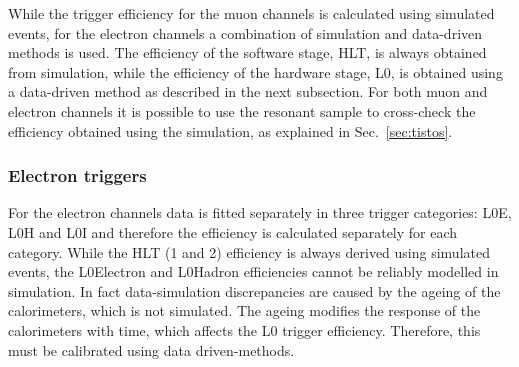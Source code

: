 While the trigger efficiency for the muon channels is calculated using simulated events,
for the electron channels a combination of simulation and data-driven methods is used.
The efficiency of the software stage, HLT, is always obtained from simulation,
while the efficiency of the hardware stage, L0, is obtained using a data-driven method
as described in the next subsection.
For both muon and electron channels it is possible to use the resonant sample to cross-check
the efficiency obtained using the simulation, as explained in Sec.~\ref{sec:tistos}.

\subsubsection{Electron triggers}
\label{sec:RKst_trigee}

For the electron channels data is fitted separately in three trigger categories: L0E, L0H and L0I
and therefore the efficiency is calculated separately for each category.
While the HLT (1 and 2) efficiency is always derived using simulated events,
the L0Electron and L0Hadron efficiencies cannot be reliably modelled in simulation.
In fact data-simulation discrepancies are caused by the ageing of the 
calorimeters, which is not simulated. The ageing modifies the response
of the calorimeters with time, which affects the L0 trigger efficiency.
Therefore, this must be calibrated using data driven-methods.

